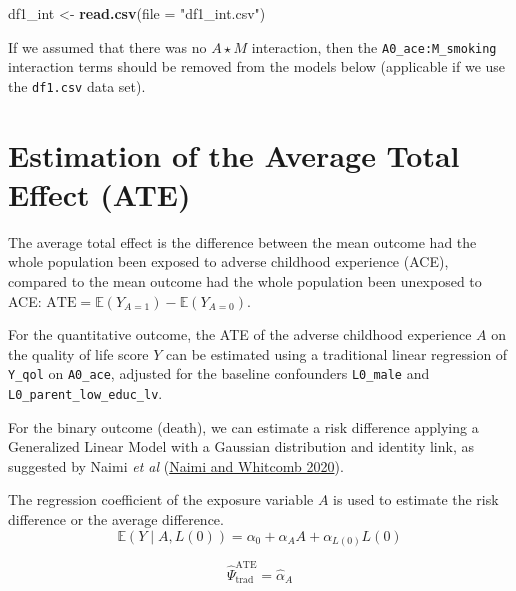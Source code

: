 \documentclass[
]{book}
\newenvironment{Shaded}{\begin{snugshade}}{\end{snugshade}}
\newcommand{\AttributeTok}[1]{\textcolor[rgb]{0.13,0.29,0.53}{#1}}
\newcommand{\FunctionTok}[1]{\textcolor[rgb]{0.13,0.29,0.53}{\textbf{#1}}}
\newcommand{\NormalTok}[1]{#1}
\newcommand{\OtherTok}[1]{\textcolor[rgb]{0.56,0.35,0.01}{#1}}
\newcommand{\StringTok}[1]{\textcolor[rgb]{0.31,0.60,0.02}{#1}}
\begin{document}
\begin{Shaded}
\begin{Highlighting}[]
\NormalTok{df1\_int }\OtherTok{\textless{}{-}} \FunctionTok{read.csv}\NormalTok{(}\AttributeTok{file =} \StringTok{"df1\_int.csv"}\NormalTok{)}
\end{Highlighting}
\end{Shaded}

If we assumed that there was no \(A \star M\) interaction, then the \texttt{A0\_ace:M\_smoking} interaction terms should be removed from the models below (applicable if we use the \texttt{df1.csv} data set).

\hypertarget{estimation-of-the-average-total-effect-ate}{%
\section{Estimation of the Average Total Effect (ATE)}\label{estimation-of-the-average-total-effect-ate}}

The average total effect is the difference between the mean outcome had the whole population been exposed to adverse childhood experience (ACE), compared to the mean outcome had the whole population been unexposed to ACE:
\(\text{ATE} = \mathbb{E}(Y_{A=1}) - \mathbb{E}(Y_{A=0})\).

For the quantitative outcome, the ATE of the adverse childhood experience \(A\) on the quality of life score \(Y\) can be estimated using a traditional linear regression of \texttt{Y\_qol} on \texttt{A0\_ace}, adjusted for the baseline confounders \texttt{L0\_male} and \texttt{L0\_parent\_low\_educ\_lv}.

For the binary outcome (death), we can estimate a risk difference applying a Generalized Linear Model with a Gaussian distribution and identity link, as suggested by Naimi \emph{et al} (\protect\hyperlink{ref-naimi2020}{Naimi and Whitcomb 2020}).

The regression coefficient of the exposure variable \(A\) is used to estimate the risk difference or the average difference.
\begin{equation} 
  \mathbb{E}(Y \mid A, L(0)) = \alpha_0 + \alpha_A A + \alpha_{L(0)} L(0) 
  \label{eq:regtotaleffect}
\end{equation}

\[ \hat{\Psi}_{\text{trad}}^{\text{ATE}} = \hat{\alpha}_A\]
\end{document}
